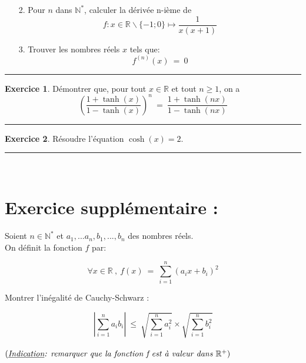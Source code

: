 \documentclass[10pt,a4paper]{article}
\newcommand{\R}{\mathbb{R}}
\newcommand{\N}{\mathbb{N}}
\theoremstyle{definition}
\theoremstyle{definition}
\newtheorem{exo}{Exercice}
\begin{document}
\begin{center}
\begin{minipage}[t]{0.45\linewidth}
\end{minipage}	
\hfill\vrule\hfill
\begin{minipage}[t]{0.45\linewidth}
\raggedright
\begin{enumerate}
\item[2.] Pour $n$ dans $\N^*$, calculer la dérivée n-ième de  
$$f : x \in\R \backslash \{-1;0\}\longmapsto\dfrac{1}{x(x+1)} $$
\item[3.] Trouver les nombres réels $x$ tels que:
$$f^{(n)}(x) \ = \ 0$$
\end{enumerate}
\begin{center}
\rule{1\linewidth}{0.6pt}
\end{center}
\begin{exo}
Démontrer que, pour tout $x\in\R$ et tout $n\geq 1$, on a
$$\left(\dfrac{1+ \tanh(x)}{1 - \tanh(x)}\right)^n \ = \ \dfrac{1+ \tanh(nx)}{1- \tanh(nx)}$$ 
\end{exo}
\begin{center}
\rule{1\linewidth}{0.6pt}
\end{center}
\begin{exo}
Résoudre l'équation $\cosh(x)=2$.
\end{exo}
\begin{center}
\rule{1\linewidth}{0.6pt}
\end{center}


	\end{minipage}
\end{center}

\quad\\

\section*{Exercice supplémentaire :}

\noindent Soient $n\in\N^*$ et $a_1,...a_n,b_1,...,b_n$ des nombres réels. \\
On définit la fonction $f$ par:

$$\forall x \in \R ~, ~f(x) \ = \ \sum\limits_{i=1}^{n}(a_ix+b_i)^2$$

Montrer l'inégalité de Cauchy-Schwarz :

 $$\left|\sum\limits_{i=1}^{n}a_ib_i\right| \ \leq \ \sqrt{\sum\limits_{i=1}^{n}a_i^2} \times \sqrt{\sum\limits_{i=1}^{n}b_i^2}$$
\quad \\

$\left(\textit{\underline{Indication}: remarquer que la fonction f est à valeur dans $\R^+$}\right)$
\end{document}
